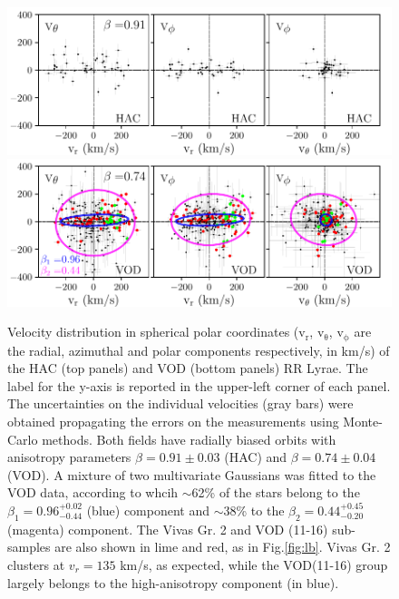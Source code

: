\documentclass[fleqn,usenatbib]{mnras}
\begin{document}
\begin{figure}
	\includegraphics[scale=0.55]{HAC_allv.pdf}
  \includegraphics[scale=0.55]{VOD_allv.pdf}
   \vspace{-0.45cm}
    \caption{Velocity distribution in spherical polar coordinates
      ($\mathrm{v_{r}}$, $\mathrm{v_{\theta}}$, $\mathrm{v_{\phi}}$
      are the radial, azimuthal and polar components respectively, in
      km/s) of the HAC (top panels) and VOD (bottom panels) RR Lyrae.
      The label for the y-axis is reported in the upper-left corner of
      each panel. The uncertainties on the individual velocities (gray
      bars) were obtained propagating the errors on the measurements
      using Monte-Carlo methods. Both fields have radially biased
      orbits with anisotropy parameters $\beta= 0.91 \pm 0.03$ (HAC)
      and $\beta= 0.74 \pm 0.04$ (VOD). A mixture of two multivariate
      Gaussians was fitted to the VOD data, according to whcih
      $\sim$62\% of the stars belong to the $\beta_{1}=
      0.96^{+0.02}_{-0.44}$ (blue) component and $\sim$38\% to the
      $\beta_{2}=0.44^{+0.45}_{-0.20}$ (magenta) component. The Vivas
      Gr. 2 and VOD (11-16) sub-samples are also shown in lime and
      red, as in Fig.\ref{fig:lb}. Vivas Gr. 2 clusters at $v_{r} =
      135$ km/s, as expected, while the VOD(11-16) group largely
      belongs to the high-anisotropy component (in blue).}
    \label{fig:vel}
\end{figure}
%
\end{document}
